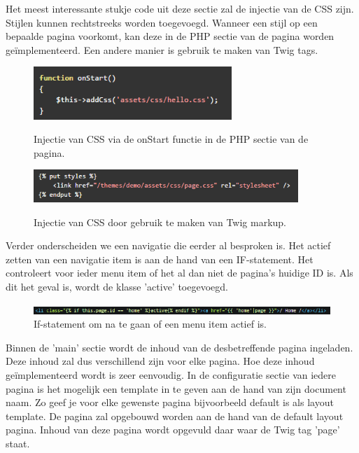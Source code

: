 \noindent
Het meest interessante stukje code uit deze sectie zal de injectie van de CSS zijn. Stijlen kunnen rechtstreeks worden toegevoegd. Wanneer een stijl op een bepaalde pagina voorkomt, kan deze in de PHP sectie van de pagina worden geïmplementeerd. Een andere manier is gebruik te maken van Twig tags.

\begin{figure}[!ht]
  \includegraphics[width=75mm]{img/oc-styles-php.png}
  \centering
  \caption{Injectie van CSS via de onStart functie in de PHP sectie van de pagina.}
  \label{fig:CSS injectie via PHP code}
  \citep{BobkovAlexey2016OctoberCMSDocumentation}
\end{figure}

\begin{figure}[!ht]
  \includegraphics[width=100mm]{img/oc-styles-twig.png}
  \centering
  \caption{Injectie van CSS door gebruik te maken van Twig markup.}
  \label{fig:CSS injectie via Twig}
  \citep{BobkovAlexey2016OctoberCMSDocumentation}
\end{figure}

\pagebreak

\noindent
Verder onderscheiden we een navigatie die eerder al besproken is. Het actief zetten van een navigatie item is aan de hand van een IF-statement. Het controleert voor ieder menu item of het al dan niet de pagina's huidige ID is. Als dit het geval is, wordt de klasse 'active' toegevoegd. 

\begin{figure}[!ht]
  \includegraphics[width=\linewidth]{img/oc-layout-nav.png}
  \caption{If-statement om na te gaan of een menu item actief is.}
  \label{fig:Menu item actief test}
\end{figure}

\noindent
Binnen de 'main' sectie wordt de inhoud van de desbetreffende pagina ingeladen. Deze inhoud zal dus verschillend zijn voor elke pagina. Hoe deze inhoud geïmplementeerd wordt is zeer eenvoudig. In de configuratie sectie van iedere pagina is het mogelijk een template in te geven aan de hand van zijn document naam. Zo geef je voor elke gewenste pagina bijvoorbeeld default is als layout template. De pagina zal opgebouwd worden aan de hand van de default layout pagina. Inhoud van deze pagina wordt opgevuld daar waar de Twig tag 'page' staat. 

